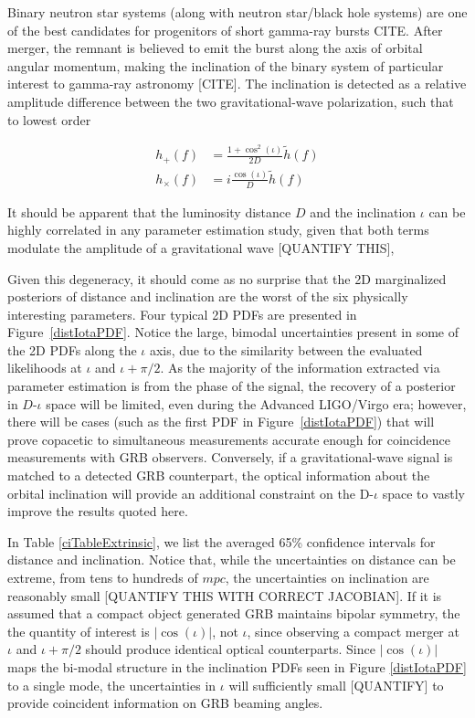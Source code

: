 \documentclass[11pt,a4paper]{emulateapj}
\newcommand{\carl}[1]{{\color{red}  #1}}
\begin{document}
Binary neutron star systems (along with neutron star/black hole systems) are one of the best candidates for progenitors of short gamma-ray bursts \carl{CITE}.  After merger, the remnant is believed to emit the burst along the axis of orbital angular momentum, making the inclination of the binary system of particular interest to gamma-ray astronomy \carl{[CITE]}.  The inclination is detected as a relative amplitude difference between the two gravitational-wave polarization, such that to lowest order

\begin{align}
h_+(f) &= \frac{1+\cos^2(\iota)}{2 D} \tilde{h}(f) \nonumber \\
h_\times(f) &= i \frac{\cos(\iota)}{D}\tilde{h}(f)
\end{align}

\noindent It should be apparent that the luminosity distance $D$ and the inclination $\iota$ can be highly correlated in any parameter estimation study, given that both terms modulate the amplitude of a gravitational wave \carl{[QUANTIFY THIS]}, 

Given this degeneracy, it should come as no surprise that the 2D marginalized posteriors of distance
 and inclination are the worst of the six physically interesting parameters.  Four typical 2D PDFs are
  presented in Figure~\ref{distIotaPDF}.  Notice the large, bimodal uncertainties 
present in some of the 2D PDFs along the $\iota$ axis, due to the similarity between the evaluated
 likelihoods at $\iota$ and $\iota + \pi/2$.  As the majority of the information extracted via parameter 
 estimation is from the phase of the signal, the recovery of a posterior in $D$-$\iota$ space will be 
 limited, even during the Advanced LIGO/Virgo era; however, there will be cases (such as the first 
 PDF in Figure~\ref{distIotaPDF})  that will prove copacetic to simultaneous measurements accurate 
 enough for coincidence measurements with GRB observers.  Conversely, if a gravitational-wave signal is 
 matched to a detected GRB counterpart, the optical information about the orbital inclination
 will provide an additional constraint on the D-$\iota$ space to vastly improve the results quoted here.
 
In Table \ref{ciTableExtrinsic}, we list the averaged 65\% confidence intervals for distance and inclination.  
Notice that, while the uncertainties on distance can be extreme, from tens to hundreds of $mpc$, the uncertainties
on inclination are reasonably small\carl{[QUANTIFY THIS WITH CORRECT JACOBIAN]}.  If it is assumed that a
 compact object generated GRB maintains bipolar symmetry, the the quantity of interest is $|\cos(\iota)|$, not 
 $\iota$, since observing a compact merger at $\iota$ and $\iota + \pi/2$ should produce identical optical counterparts.  
Since $|\cos(\iota)|$ maps the bi-modal structure in the inclination PDFs seen in Figure \ref{distIotaPDF} to a single
mode, the uncertainties in $\iota$ will sufficiently small \carl{[QUANTIFY]} to provide coincident information on
GRB beaming angles.
\end{document}
